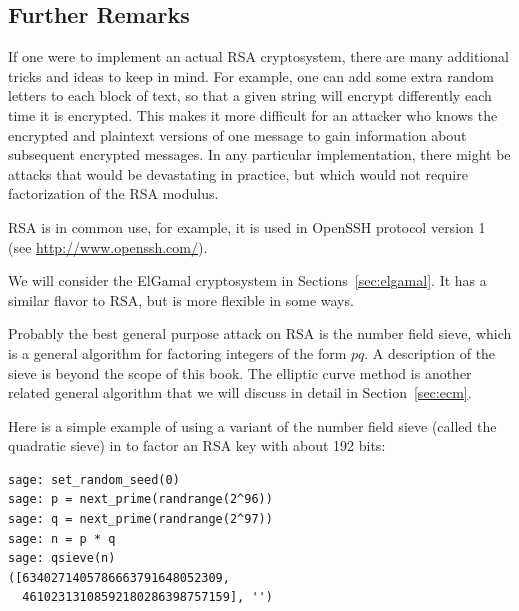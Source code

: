 
\subsection{Further Remarks}
If one were to implement an actual RSA cryptosystem, there are many
additional tricks and ideas to keep in mind.  For example, one can add
some extra random letters to each block of text, so that a given
string will encrypt differently each time it is encrypted.  This makes
it more difficult for an attacker who knows the encrypted and
plaintext versions of one message to gain information about subsequent
encrypted messages.
In any particular implementation, there might be
attacks that would be devastating in practice, but which would not
require factorization of the RSA modulus.

RSA is in common use, for example, it is used
in OpenSSH protocol version 1 (see \url{http://www.openssh.com/}).

We will consider the ElGamal cryptosystem in
Sections~\ref{sec:elgamal}.  It has a similar
flavor to RSA, but is more flexible in some ways.

Probably the best general purpose attack on RSA is the number field
sieve, which is a general algorithm for factoring integers of the form
$pq$.  A description of the sieve is beyond the scope of this book.
The elliptic curve method is another related general algorithm that we
will discuss in detail in Section~\ref{sec:ecm}.
\begin{sg}
Here is a simple example of using a variant of the number
field sieve (called the quadratic sieve) in \sage to factor an RSA key with about 192 bits:
\begin{verbatim}
sage: set_random_seed(0)
sage: p = next_prime(randrange(2^96))
sage: q = next_prime(randrange(2^97))
sage: n = p * q
sage: qsieve(n)
([6340271405786663791648052309,
  46102313108592180286398757159], '')
\end{verbatim}
\end{sg}

